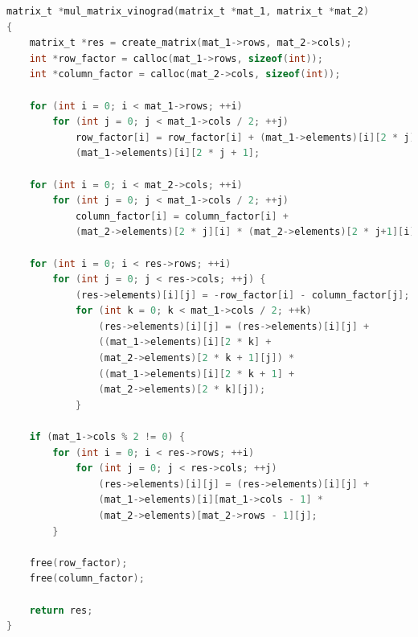 \documentclass[a4paper,14pt, unknownkeysallowed]{extreport}
\begin{document}
\clearpage
	
\begin{lstlisting}[label=wino,caption=Листинг алгоритма Винограда,language=C]
matrix_t *mul_matrix_vinograd(matrix_t *mat_1, matrix_t *mat_2)
{
    matrix_t *res = create_matrix(mat_1->rows, mat_2->cols);
    int *row_factor = calloc(mat_1->rows, sizeof(int));
    int *column_factor = calloc(mat_2->cols, sizeof(int));
    
    for (int i = 0; i < mat_1->rows; ++i)
        for (int j = 0; j < mat_1->cols / 2; ++j)
            row_factor[i] = row_factor[i] + (mat_1->elements)[i][2 * j]* 
            (mat_1->elements)[i][2 * j + 1];
    
    for (int i = 0; i < mat_2->cols; ++i)
        for (int j = 0; j < mat_1->cols / 2; ++j)
            column_factor[i] = column_factor[i] + 
            (mat_2->elements)[2 * j][i] * (mat_2->elements)[2 * j+1][i];
    	
    for (int i = 0; i < res->rows; ++i)
        for (int j = 0; j < res->cols; ++j) {
    		(res->elements)[i][j] = -row_factor[i] - column_factor[j];
    		for (int k = 0; k < mat_1->cols / 2; ++k)
                (res->elements)[i][j] = (res->elements)[i][j] + 
                ((mat_1->elements)[i][2 * k] +
                (mat_2->elements)[2 * k + 1][j]) * 
                ((mat_1->elements)[i][2 * k + 1] +
                (mat_2->elements)[2 * k][j]);
    		}
    
    if (mat_1->cols % 2 != 0) {
        for (int i = 0; i < res->rows; ++i)
            for (int j = 0; j < res->cols; ++j)
                (res->elements)[i][j] = (res->elements)[i][j] +
                (mat_1->elements)[i][mat_1->cols - 1] * 
                (mat_2->elements)[mat_2->rows - 1][j];
        }
    
    free(row_factor);
    free(column_factor);
    
    return res;
}
\end{lstlisting}

\clearpage
\end{document}
